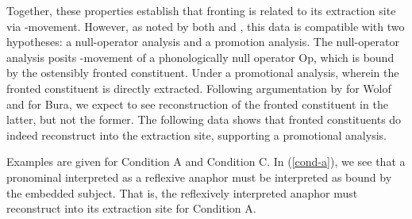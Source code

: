 \documentclass[12pt]{article}
\begin{document}

\begin{samepage}
\bex
\ex {}\label{island-ngo}
\bxl
\fxl
\fex
\end{samepage}

Together, these properties establish that fronting is related to its extraction site via \abar{}-movement. However, as noted by both \citet{torrence-2013vol,torrence-2013} and \citet{hartmann-zimmermann-2012}, this data is compatible with two hypotheses: a null-operator analysis and a promotion analysis. The null-operator analysis posits \abar{}-movement of a phonologically null operator Op, which is bound by the ostensibly fronted constituent. Under a promotional analysis, wherein the fronted constituent is directly extracted. Following argumentation by \citeauthor{torrence-2013} for Wolof and \citeauthor{hartmann-zimmermann-2012} for Bura, we expect to see reconstruction of the fronted constituent in the latter, but not the former. The following data shows that fronted constituents do indeed reconstruct into the extraction site, supporting a promotional analysis.

Examples are given for Condition A and Condition C. In (\ref{cond-a}), we see that a pronominal interpreted as a reflexive anaphor must be interpreted as bound by the embedded subject. That is, the reflexively interpreted anaphor must reconstruct into its extraction site for Condition A.
\end{document}
